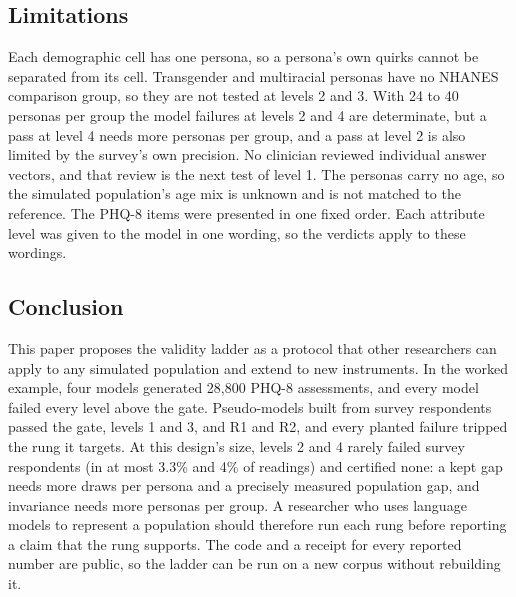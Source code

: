 
\subsection{Limitations}

Each demographic cell has one persona, so a persona's own quirks cannot be separated from its cell.
Transgender and multiracial personas have no NHANES comparison group, so they are not tested at levels 2 and 3.
With 24 to 40 personas per group the model failures at levels 2 and 4 are determinate, but a pass at level 4 needs more personas per group, and a pass at level 2 is also limited by the survey's own precision.
No clinician reviewed individual answer vectors, and that review is the next test of level 1.
The personas carry no age, so the simulated population's age mix is unknown and is not matched to the reference.
The PHQ-8 items were presented in one fixed order.
Each attribute level was given to the model in one wording, so the verdicts apply to these wordings.

\subsection{Conclusion}

This paper proposes the validity ladder as a protocol that other researchers can apply to any simulated population and extend to new instruments.
In the worked example, four models generated 28,800 PHQ-8 assessments, and every model failed every level above the gate. %
Pseudo-models built from survey respondents passed the gate, levels 1 and 3, and R1 and R2, and every planted failure tripped the rung it targets.
At this design's size, levels 2 and 4 rarely failed survey respondents (in at most 3.3\% and 4\% of readings) and certified none: a kept gap needs more draws per persona and a precisely measured population gap, and invariance needs more personas per group.
A researcher who uses language models to represent a population should therefore run each rung before reporting a claim that the rung supports.
The code and a receipt for every reported number are public, so the ladder can be run on a new corpus without rebuilding it.
